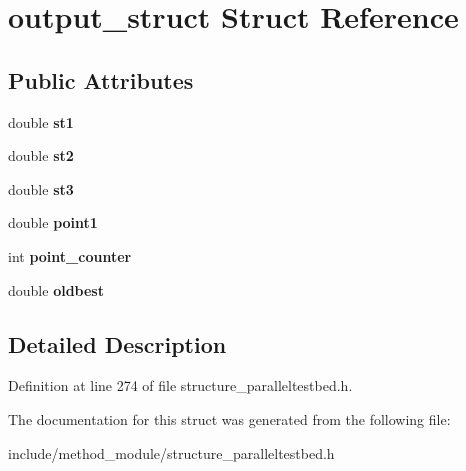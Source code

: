 \hypertarget{structoutput__struct}{\section{output\-\_\-struct Struct Reference}
\label{structoutput__struct}
}
\subsection*{Public Attributes}
\begin{DoxyCompactItemize}
\item 
\hypertarget{structoutput__struct_a5a3edf6265cbd1cfdb97bf8a149a65c9}{double {\bfseries st1}}\label{structoutput__struct_a5a3edf6265cbd1cfdb97bf8a149a65c9}

\item 
\hypertarget{structoutput__struct_ac971b780b38d20f8909f834904125a21}{double {\bfseries st2}}\label{structoutput__struct_ac971b780b38d20f8909f834904125a21}

\item 
\hypertarget{structoutput__struct_ab1bade203b8af9df77f18b0b7eeac0b1}{double {\bfseries st3}}\label{structoutput__struct_ab1bade203b8af9df77f18b0b7eeac0b1}

\item 
\hypertarget{structoutput__struct_acbab3ce1773c48def597c347a0c06a20}{double {\bfseries point1}}\label{structoutput__struct_acbab3ce1773c48def597c347a0c06a20}

\item 
\hypertarget{structoutput__struct_a66f2e1194215bcac831e6765999d3afd}{int {\bfseries point\-\_\-counter}}\label{structoutput__struct_a66f2e1194215bcac831e6765999d3afd}

\item 
\hypertarget{structoutput__struct_ab84009db6a57b5c8141e6c98320b25e7}{double {\bfseries oldbest}}\label{structoutput__struct_ab84009db6a57b5c8141e6c98320b25e7}

\end{DoxyCompactItemize}


\subsection{Detailed Description}


Definition at line 274 of file structure\-\_\-paralleltestbed.\-h.



The documentation for this struct was generated from the following file\-:\begin{DoxyCompactItemize}
\item 
include/method\-\_\-module/structure\-\_\-paralleltestbed.\-h\end{DoxyCompactItemize}
